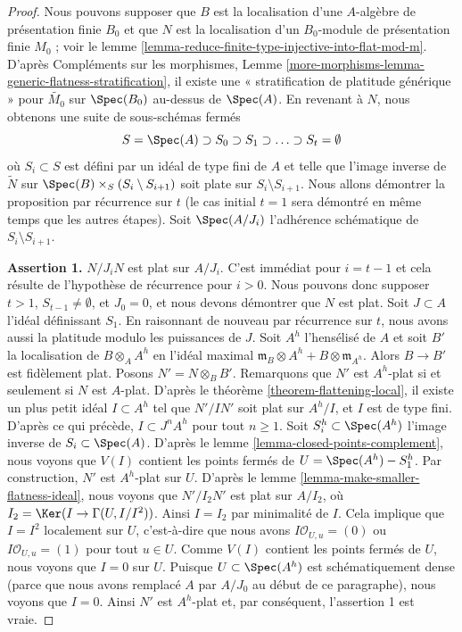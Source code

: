\begin{proof}
Nous pouvons supposer que $B$ est la localisation d'une
$A$-algèbre de présentation finie $B_0$ et que $N$ est la localisation d'un
$B_0$-module de présentation finie $M_0$ ; voir le
lemme \ref{lemma-reduce-finite-type-injective-into-flat-mod-m}.
D'après Compléments sur les morphismes, Lemme
\ref{more-morphisms-lemma-generic-flatness-stratification},
il existe une « stratification de platitude générique »
pour $\widetilde{M_0}$ sur $\Spec(B_0)$ au-dessus de $\Spec(A)$.
En revenant à $N$, nous obtenons une suite de sous-schémas fermés
$$
S = \Spec(A) \supset S_0 \supset S_1 \supset \ldots \supset S_t = \emptyset
$$
où $S_i \subset S$ est défini par un idéal de type fini de $A$
et telle que l'image inverse de $\widetilde{N}$ sur
$\Spec(B) \times_S (S_i \setminus S_{i + 1})$ soit plate sur
$S_i \setminus S_{i + 1}$. Nous allons démontrer la proposition par
récurrence sur $t$ (le cas initial $t = 1$ sera démontré en même temps
que les autres étapes). Soit $\Spec(A/J_i)$ l'adhérence schématique
de $S_i \setminus S_{i + 1}$.

\medskip\noindent
{\bf Assertion 1.} $N/J_iN$ est plat sur $A/J_i$. C'est immédiat pour
$i = t - 1$ et cela résulte de l'hypothèse de récurrence pour $i > 0$.
Nous pouvons donc supposer $t > 1$, $S_{t - 1} \not = \emptyset$, et
$J_0 = 0$, et nous devons démontrer que $N$ est plat. Soit $J \subset A$
l'idéal définissant $S_1$. En raisonnant de nouveau par récurrence sur $t$, nous avons aussi
la platitude modulo les puissances de $J$. Soit $A^h$ l'hensélisé de $A$
et soit $B'$ la localisation de $B \otimes_A A^h$ en l'idéal maximal
$\mathfrak m_B \otimes A^h + B \otimes \mathfrak m_{A^h}$. Alors $B \to B'$
est fidèlement plat. Posons $N' = N \otimes_B B'$. Remarquons que $N'$
est $A^h$-plat si et seulement si $N$ est $A$-plat. D'après le
théorème \ref{theorem-flattening-local}, il existe un plus petit idéal
$I \subset A^h$ tel que $N'/IN'$ soit plat sur $A^h/I$, et
$I$ est de type fini. D'après ce qui précède, $I \subset J^nA^h$ pour
tout $n \geq 1$. Soit $S_i^h \subset \Spec(A^h)$ l'image inverse
de $S_i \subset \Spec(A)$. D'après le lemme \ref{lemma-closed-points-complement},
nous voyons que $V(I)$ contient les points fermés de $U = \Spec(A^h) - S_1^h$.
Par construction, $N'$ est $A^h$-plat sur $U$.
D'après le lemme \ref{lemma-make-smaller-flatness-ideal}, nous voyons que $N'/I_2N'$
est plat sur $A/I_2$, où
$I_2 = \Ker(I \to \Gamma(U, I/I^2))$. Ainsi $I = I_2$ par minimalité
de $I$. Cela implique que $I = I^2$ localement sur $U$, c'est-à-dire
que nous avons $I\mathcal{O}_{U, u} = (0)$ ou $I\mathcal{O}_{U, u} = (1)$
pour tout $u \in U$. Comme $V(I)$ contient les points fermés de $U$,
nous voyons que $I = 0$ sur $U$. Puisque $U \subset \Spec(A^h)$ est schématiquement
dense (parce que nous avons remplacé $A$ par $A/J_0$ au début
de ce paragraphe), nous voyons que $I = 0$. Ainsi $N'$ est $A^h$-plat
et, par conséquent, l'assertion 1 est vraie.


\end{proof}
